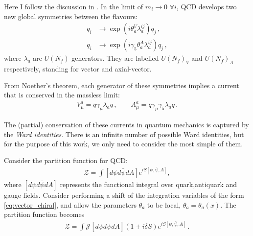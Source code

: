 Here I follow the discussion in \cite{Scherer:2002tk}. In the limit of $m_i\to 0\,\,\forall i$, QCD develops two new global symmetries between the flavours:
\begin{align}
  \label{eq:vector_chiral}
  q_i &\to \exp(i\theta_a^V \lambda^{ij}_a) q_j\,, \\
  q_i &\to \exp(i\gamma_5 \theta_a^A \lambda^{ij}_a) q_j\,,
\end{align}
where $\lambda_a$ are $U(N_f)$ generators. They are labelled $U(N_f)_V$ and $U(N_f)_A$ respectively, standing for vector and axial-vector.

From Noether's theorem, each generator of these symmetries implies a current that is conserved in the massless limit:
\begin{align}
  \label{eq:chiralcurrents}
  V_{\mu}^a = \bar{q} \gamma_{\mu} \lambda_a q\,, \quad\quad
  A_{\mu}^a = \bar{q} \gamma_{\mu} \gamma_5 \lambda_a q\,.
\end{align}

The (partial) conservation of these currents in quantum mechanics is captured by the {\it{Ward identities}}. There is an infinite number of possible Ward identities, but for the purpose of this work, we only need to consider the most simple of them. %

Consider the partition function for QCD:
\begin{align}
  \mathcal{Z} = \int [d\psi d\bar{\psi} dA] e^{iS[\psi,\bar{\psi},A]},
\end{align}
where $[d\psi d\bar{\psi} dA]$ represents the functional integral over quark,antiquark and gauge fields. Consider performing a shift of the integration variables of the form \eqref{eq:vector_chiral}, and allow the parameters $\theta_a$ to be local, $\theta_a=\theta_a(x)$. The partition function becomes
\begin{align}
  \mathcal{Z} = \int \mathcal{J} [d\psi d\bar{\psi} dA] ( 1 + i\delta S ) e^{iS[\psi,\bar{\psi},A]}\,.
  \label{eq:partition_transformed}
\end{align}

